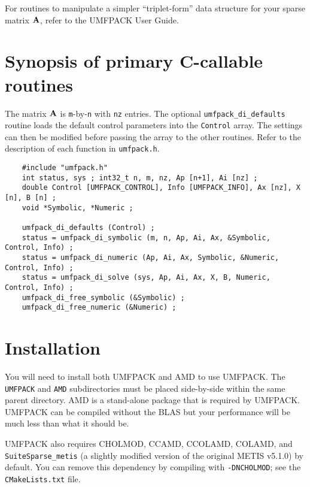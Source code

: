 \documentclass[11pt]{article}
\newcommand{\m}[1]{{\bf{#1}}}       %
\begin{document}
For routines to manipulate a simpler ``triplet-form'' data structure for your
sparse matrix $\m{A}$, refer to the UMFPACK User Guide.

\section{Synopsis of primary C-callable routines}
\label{Synopsis}

The matrix $\m{A}$ is {\tt m}-by-{\tt n} with {\tt nz} entries.
The optional {\tt umfpack\_di\_defaults} routine loads the default control
parameters into the {\tt Control} array.  The settings can then be modified
before passing the array to the other routines.  Refer to the description
of each function in \verb'umfpack.h'.

{\footnotesize
\begin{verbatim}
    #include "umfpack.h"
    int status, sys ; int32_t n, m, nz, Ap [n+1], Ai [nz] ;
    double Control [UMFPACK_CONTROL], Info [UMFPACK_INFO], Ax [nz], X [n], B [n] ;
    void *Symbolic, *Numeric ;

    umfpack_di_defaults (Control) ;
    status = umfpack_di_symbolic (m, n, Ap, Ai, Ax, &Symbolic, Control, Info) ;
    status = umfpack_di_numeric (Ap, Ai, Ax, Symbolic, &Numeric, Control, Info) ;
    status = umfpack_di_solve (sys, Ap, Ai, Ax, X, B, Numeric, Control, Info) ;
    umfpack_di_free_symbolic (&Symbolic) ;
    umfpack_di_free_numeric (&Numeric) ;
\end{verbatim}
}

\section{Installation}
\label{Install}

You will need to install both UMFPACK and AMD to use UMFPACK.
The {\tt UMFPACK} and {\tt AMD} subdirectories must be placed side-by-side
within the same parent directory.  AMD is a stand-alone package that
is required by UMFPACK.  UMFPACK can be compiled without the
BLAS
but your performance will be much less than what it should be.

UMFPACK also requires CHOLMOD, CCAMD, CCOLAMD, COLAMD, and
\verb'SuiteSparse_metis' (a slightly modified version of the original
METIS v5.1.0) by default.  You can remove this dependency by compiling with
\verb'-DNCHOLMOD'; see the \verb'CMakeLists.txt' file.
\end{document}
